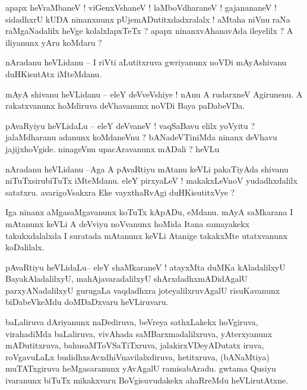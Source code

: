 \documentclass{article}
\begin{document}
\begin{mn}%
apapx heVraMbaneV ! viGenxVshaneV ! laMboVdharaneV ! gajanananeV ! sidadhxrU kUDA ninanxnunx 
pUjemADutitxdadxralalx ! aMtaha niVnu raNa raMgaNadalilx heVge kolalxlapxTeTx ? apapx 
ninanxvAhanavAda ileyelilx ? A iliyanunx yAru koMdaru ?
\end{mn}

\begin{mn}%
nAradanu heVLidanu -- I riVti aLutitxruva gwriyanunx noVDi mAyAshivanu duHKisutAtx iMteMdanu.
\end{mn}

\begin{mn}%
mAyA shivanu heVLidanu -- eleY deVveVshiye ! nAnu A rudarxneV Agirunenu. A rakatxvanunx 
hoMdiruva deVhavanunx noVDi Baya paDabeVDa.
\end{mn}

\begin{mn}%
pAvaRyiyu heVLidaLu -- eleY deVvaneV ! vaqSaBavu elilx yoVyitu ? jalaMdharanu adanunx 
koMdaneVnu ? bANadeVTiniMda ninanx deVhavu jajijxhoVgide. ninageVnu upacAravanunx mADali ? 
heVLu
\end{mn}

\begin{mn}%
nAradanu heVLidanu --Aga A pAvaRtiyu mAtanu keVLi pakaTiyAda shivanu niTuTxsirubiTuTx 
iMteMdanu. eleY pirxyaLeV ! makakxLeVnoV yudadhxdalilx satatxru. avarigoVsakxra Eke 
vayxthaRvAgi duHKisutitxVye ?
\end{mn}

\begin{mn}%
Iga ninanx aMgasaMgavanunx koTuTx kApADu, eMdanu. mAyA saMkarana I mAtanunx keVLi A deVviyu 
noVvanunx hoMida Itana samayakekx takukxdalalxda I suratada mAtanunx keVLi Atanige 
takakxMte utatxvanunx koDalilalx.
\end{mn}

\begin{mn}%
pAvaRtiyu heVLidaLu-- eleY shaMkaraneV ! atayxMta duMKa kAladalilxyU BayakAladalilxyU, 
mahAjavaradalilxyU shArxdadhxmADidAgalU parxyANadalilxyU gurugaLa vaqdadhxra 
joteyalilxruvAgalU risuKavanunx biDabeVkeMdu doMDaDxvaru heVLiruvaru.
\end{mn}

\begin{mn}%
baLaliruva dAriyanunx naDediruva, beVreya sathxLakekx hoVgiruva, virahadiMda baLaliruva, 
vivAhada saMBarxmadalilxruva, yAterxyanunx mADutitxruva, bahusaMToVSaTiTxruva, 
jalakirxVDeyADutatx iruva, roVgavuLaLx budidhxsAvxdhiVnavilalxdiruva, hetitxruva, 
(bANaMtiya) muTATxgiruva heMgasaranunx yAvAgalU ramisabAradu. gwtama Qusiyu ivaranunx 
biTuTx mikakxvaru BoVgisuvudakekx ahaRreMdu heVLirutAtxne.
\end{mn}
\end{document}
